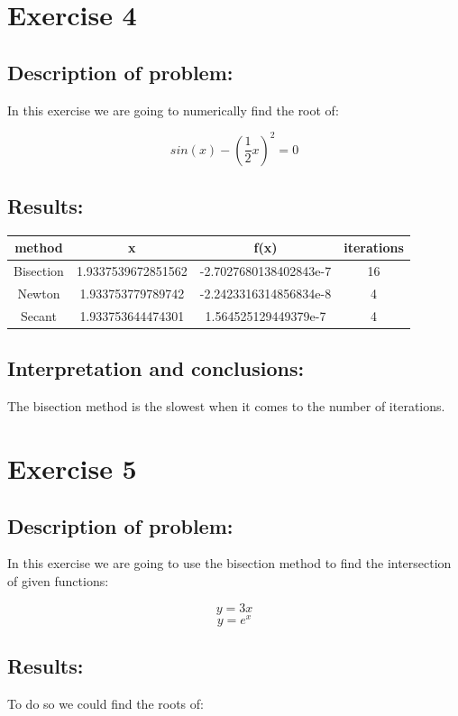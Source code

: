 \documentclass{article}
\begin{document}
\section*{Exercise 4}
\subsection*{Description of problem:}
In this exercise we are going to numerically find the root of:

\[
    sin(x) - (\frac{1}{2}x)^2 = 0
\]

\subsection*{Results:}
\begin{center}
    \begin{tabular}{| c | c | c | c |}
        \hline
         method & x & f(x) & iterations \\ 
        \hline
        \hline
        Bisection & 1.9337539672851562 & -2.7027680138402843e-7 &  16 \\
        \hline
        Newton & 1.933753779789742 & -2.2423316314856834e-8 & 4 \\
        \hline
        Secant & 1.933753644474301 &  1.564525129449379e-7 & 4 \\
        \hline
    \end{tabular}
\end{center}

\subsection*{Interpretation and conclusions:}
The bisection method is the slowest when it comes to the number of iterations.

\section*{Exercise 5}
\subsection*{Description of problem:}
In this exercise we are going to use the bisection method to find the intersection of given functions:

\[
    y = 3x
\]
\[
    y = e^x
\]

\subsection*{Results:}
To do so we could find the roots of:
\end{document}
